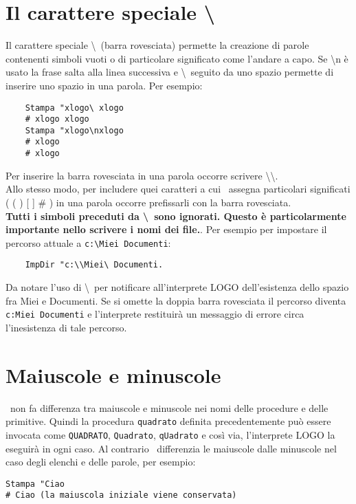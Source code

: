 \section{Il carattere speciale \textbackslash}
Il carattere speciale  \textbackslash \ (barra rovesciata) permette la creazione di parole contenenti simboli vuoti o di particolare significato come l'andare a capo. Se \textbackslash n è usato la frase salta alla linea successiva e \textbackslash\textvisiblespace\ seguito da uno spazio permette di inserire uno spazio in una parola. Per esempio:
\begin{lstlisting}
	Stampa "xlogo\ xlogo
	# xlogo xlogo
	Stampa "xlogo\nxlogo
	# xlogo
	# xlogo
\end{lstlisting}

Per inserire la barra rovesciata in una parola occorre scrivere \textbackslash\textbackslash.\\
Allo stesso modo, per includere quei caratteri a cui \xlogo\ assegna particolari significati ( ( ) [ ] \# ) in una parola occorre prefissarli con la barra rovesciata.  \\
\textbf{Tutti i simboli preceduti da \textbackslash \ sono ignorati. Questo è particolarmente importante nello scrivere i nomi dei file.}. Per esempio per impostare il percorso attuale a \texttt{c:\textbackslash Miei Documenti}:
\begin{lstlisting}
	ImpDir "c:\\Miei\ Documenti.
\end{lstlisting}

Da notare l'uso di \textbackslash\textvisiblespace \ per notificare all'interprete LOGO dell'esistenza dello spazio fra Miei e Documenti. Se si omette la doppia barra rovesciata il percorso diventa  \texttt{c:Miei Documenti} e l'interprete restituirà un messaggio di errore circa l'inesistenza di tale percorso.


\section{Maiuscole e minuscole}

\xlogo\ non fa differenza tra maiuscole e minuscole nei nomi delle procedure e delle primitive. Quindi la procedura \texttt{quadrato} definita precedentemente può essere invocata come \texttt{QUADRATO}, \texttt{Quadrato}, \texttt{qUadrato} e così via, l'interprete LOGO la eseguirà in ogni caso. Al contrario \xlogo\ differenzia le maiuscole dalle minuscole nel caso degli elenchi e delle parole, per esempio:
\begin{lstlisting}
Stampa "Ciao
# Ciao (la maiuscola iniziale viene conservata)
\end{lstlisting}


